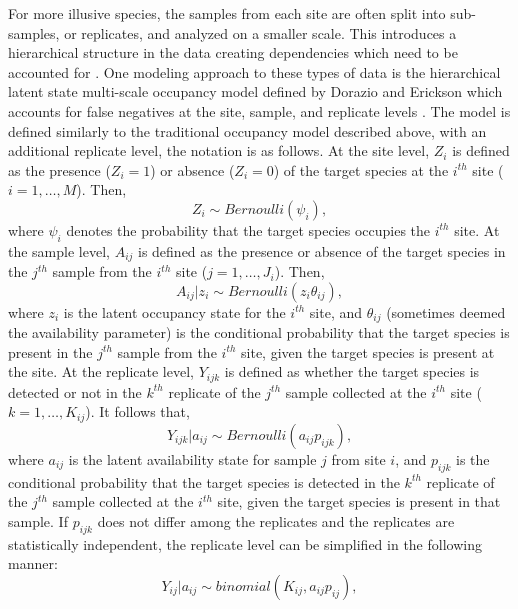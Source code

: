 \documentclass[12pt]{article}\usepackage[]{graphicx}\usepackage[]{color}
\begin{document}
For more illusive species, the samples from each site are often split into sub-samples, or replicates, and analyzed on a smaller scale. This introduces a hierarchical structure in the data creating dependencies which need to be accounted for \cite{MacKenzie}. One modeling approach to these types of data is the hierarchical latent state multi-scale occupancy model defined by Dorazio and Erickson which accounts for false negatives at the site, sample, and replicate levels \cite{Dorazio_Erickson}. The model is defined similarly to the traditional occupancy model described above, with an additional replicate level, the notation is as follows. At the site level, $Z_i$ is defined as the presence ($Z_i = 1$) or absence ($Z_i = 0$) of the target species at the $i^{th}$ site ($i = 1, \dots, M$). Then, 
$$Z_i \sim Bernoulli(\psi_i),$$ 
\noindent where $\psi_i$ denotes the probability that the target species occupies the $i^{th}$ site. At the sample level, $A_{ij}$ is defined as the presence or absence of the target species in the $j^{th}$ sample from the $i^{th}$ site ($j = 1, \dots, J_i$). Then, 
$$A_{ij}|z_i \sim Bernoulli(z_i\theta_{ij}),$$ 
\noindent where $z_i$ is the latent occupancy state for the $i^{th}$ site, and $\theta_{ij}$ (sometimes deemed the availability parameter) is the conditional probability that the target species is present in the $j^{th}$ sample from the $i^{th}$ site, given the target species is present at the site. At the replicate level, $Y_{ijk}$ is defined as whether the target species is detected or not in the $k^{th}$ replicate of the $j^{th}$ sample collected at the $i^{th}$ site ($k = 1, \dots, K_{ij}$). It follows that, 
$$Y_{ijk}|a_{ij} \sim Bernoulli(a_{ij}p_{ijk}),$$ 
\noindent where $a_{ij}$ is the latent availability state for sample $j$ from site $i$, and $p_{ijk}$ is the conditional probability that the target species is detected in the $k^{th}$ replicate of the $j^{th}$ sample collected at the $i^{th}$ site, given the target species is present in that sample. If $p_{ijk}$ does not differ among the replicates and the replicates are statistically independent, the replicate level can be simplified in the following manner: 
$$Y_{ij}|a_{ij} \sim binomial(K_{ij}, a_{ij}p_{ij}),$$ 
\end{document}
